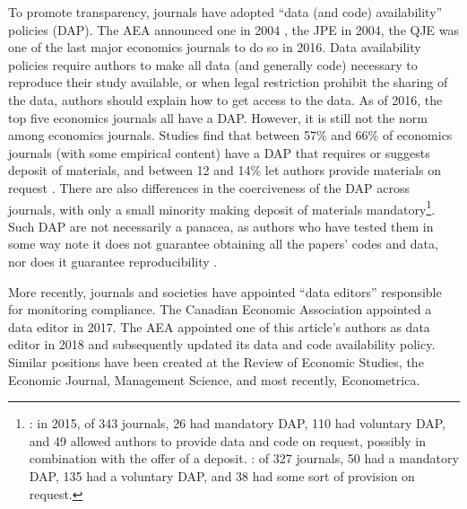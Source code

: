 To promote transparency, journals have adopted ``data (and code) availability'' policies (DAP). The \ac{AEA} announced one in 2004 \parencite{bernanke2004}, the \ac{JPE} in 2004, the \ac{QJE} was one of the last major economics journals to do so in 2016. Data availability policies require authors to make all data (and generally code) necessary to reproduce their study available, or when legal restriction prohibit the sharing of the data, authors should explain how to get access to the data. As of 2016, the top five economics journals all have a DAP. However, it is still not the norm among economics journals. Studies find that between 57\% and 66\% of economics journals (with some empirical content) have a DAP that requires or suggests deposit of materials, and between 12 and 14\% let authors provide materials on request \parencite{Hoeffler2017,vlaeminck2021}. There are also differences in the coerciveness of the DAP across journals, with only a small minority making deposit of materials mandatory\footnote{\textcite{Hoeffler2017}: in 2015, of 343 journals, 26 had mandatory DAP, 110 had voluntary DAP, and 49 allowed authors to provide data and code on request, possibly in combination with the offer of a deposit. \textcite{vlaeminck2021}: of 327 journals, 50 had a mandatory DAP, 135 had a voluntary DAP, and 38 had some sort of provision on request.}. Such DAP are not necessarily a panacea, as authors who have tested them in some way note it does not guarantee obtaining all the papers' codes and data, nor does it guarantee reproducibility \parencite{Glandon2010,Hoeffler2017,Stodden2018}.

More recently, journals and societies have appointed ``data editors'' responsible for monitoring compliance. The Canadian Economic Association appointed a data editor  in 2017. The \ac{AEA} appointed one of this article's authors as data editor in 2018  \parencite{10.1257/pandp.108.745} and subsequently updated its data and code availability policy. Similar positions have been created at the Review of Economic Studies, the Economic Journal, Management Science, and most recently, Econometrica. 

